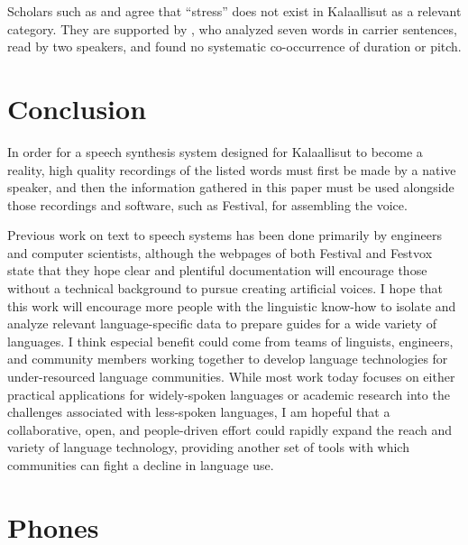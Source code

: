 \documentclass[12pt]{article}
\begin{document}
	Scholars such as \citet{rischel} and \citet{anja} agree that ``stress'' does not exist in Kalaallisut as a relevant category. They are supported by \citet{jacobsen}, who analyzed seven words in carrier sentences, read by two speakers, and found no systematic co-occurrence of duration or pitch. \par

\section{Conclusion}

In order for a speech synthesis system designed for Kalaallisut to become a reality, high quality recordings of the listed words must first be made by a native speaker, and then the information gathered in this paper must be used alongside those recordings and software, such as Festival, for assembling the voice. \par

Previous work on text to speech systems has been done primarily by engineers and computer scientists, although the webpages of both Festival and Festvox state that they hope clear and plentiful documentation will encourage those without a technical background to pursue creating artificial voices. I hope that this work will encourage more people with the linguistic know-how to isolate and analyze relevant language-specific data to prepare guides for a wide variety of languages. I think especial benefit could come from teams of linguists, engineers, and community members working together to develop language technologies for under-resourced language communities. While most work today focuses on either practical applications for widely-spoken languages or academic research into the challenges associated with less-spoken languages, I am hopeful that a collaborative, open, and people-driven effort could rapidly expand the reach and variety of language technology, providing another set of tools with which communities can fight a decline in language use. \par

\newpage

\appendix
\section{Phones}
\end{document}
